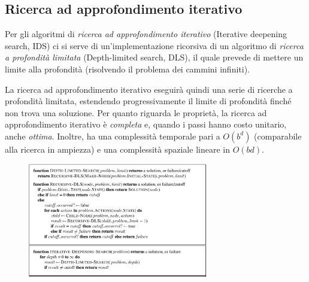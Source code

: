 \documentclass[11pt,oneside]{book}
\begin{document}
\subsection{Ricerca ad approfondimento iterativo}
Per gli algoritmi di \textit{ricerca ad approfondimento iterativo} (Iterative deepening search, IDS) ci si serve di un'implementazione ricorsiva di un algoritmo di \textit{ricerca a profondità limitata} (Depth-limited search, DLS), il quale prevede di mettere un limite alla profondità (risolvendo il problema dei cammini infiniti).

La ricerca ad approfondimento iterativo eseguirà quindi una serie di ricerche a profondità limitata, estendendo progressivamente il limite di profondità finché non trova una soluzione. Per quanto riguarda le proprietà, la ricerca ad approfondimento iterativo è \textit{completa} e, quando i passi hanno costo unitario, anche \textit{ottima}. Inoltre, ha una complessità temporale pari a $O(b^d)$ (comparabile alla ricerca in ampiezza) e una complessità spaziale lineare in $O(bd)$.
\begin{figure}[htp]
	\centering
	\includegraphics[width=0.7\textwidth]{ids.png}
\end{figure}
\end{document}
